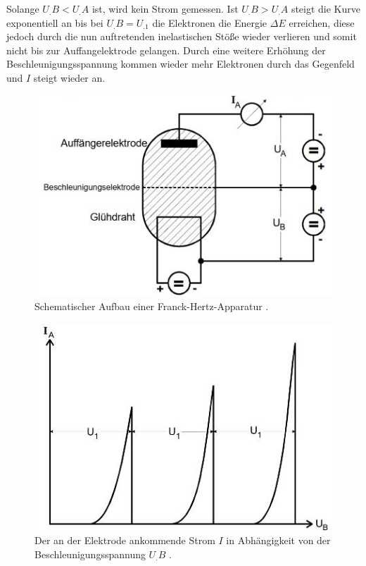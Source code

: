 Solange $U_.B<U_.A$ ist, wird kein Strom gemessen. Ist $U_.B>U_.A$ steigt die Kurve exponentiell an bis bei 
$U_.B=U_.1$ die Elektronen die Energie $\Delta E$ erreichen, diese jedoch durch die nun auftretenden inelastischen Stöße wieder verlieren und somit nicht bis zur Auffangelektrode gelangen. Durch eine weitere Erhöhung der Beschleunigungsspannung kommen wieder mehr Elektronen durch das Gegenfeld und $I$  steigt wieder an.
\begin{figure}
\centering
\includegraphics[scale=0.7]{content/images/apparatur.jpg}
\caption{Schematischer Aufbau einer Franck-Hertz-Apparatur \cite{V601}.}
\label{fig:apparat}
\end{figure}
\begin{figure}
\centering
\includegraphics[scale=0.56]{content/images/I_theo.jpg}
\caption{Der an der Elektrode ankommende Strom $I$ in Abhängigkeit von der Beschleunigungsspannung $U_.B$ \cite{V601}.}
\label{fig:I_theo}
\end{figure}
